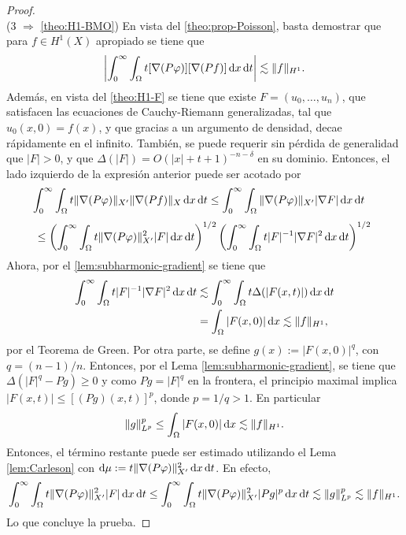 \begin{proof}
\begin{equation*}
	\end{equation*}
	(3 $\Rightarrow$ \cref{theo:H1-BMO}) En vista del \cref{theo:prop-Poisson}, basta demostrar que para $f\in H^1(X)$ apropiado se tiene que
	\begin{equation*}
		\left| \int_0^\infty \int_{\Omega} t[\nabla(P\varphi)][\nabla(Pf)]\mathop{}\!\mathrm{d} x \mathop{}\!\mathrm{d} t
		\right| \lesssim \|f\|_{H^1}.
	\end{equation*}
	Además, en vista del \cref{theo:H1-F} se tiene que existe $F=(u_0,\ldots, u_n)$, que satisfacen las ecuaciones de Cauchy-Riemann generalizadas, tal que $u_0(x, 0)=f(x)$, y que gracias a un argumento de densidad, decae rápidamente en el infinito. También, se puede requerir sin pérdida de generalidad que $|F|>0$, y que $\Delta(|F|) = O(|x|+t+1)^{-n-\delta}$ en su dominio. Entonces, el lado izquierdo de la expresión anterior puede ser acotado por 
	\begin{align*}
		\int_0^\infty \int_{\Omega} t\|\nabla(P\varphi)\|_{X'}\|\nabla(Pf)\|_X\mathop{}\!\mathrm{d} x \mathop{}\!\mathrm{d} t & \leq\int_0^\infty \int_{\Omega}  \|\nabla(P\varphi)\|_{X'}|\nabla F|\mathop{}\!\mathrm{d} x\mathop{}\!\mathrm{d} t
	\end{align*}
	\begin{equation*}
		\leq \left( \int_0^\infty \int_{\Omega} t\|\nabla(P\varphi)\|_{X'}^2|F| \mathop{}\!\mathrm{d} x \mathop{}\!\mathrm{d} t
		\right)^{1/2}\left(\int_0^\infty \int_{\Omega}  t|F|^{-1}|\nabla F|^2 \mathop{}\!\mathrm{d} x \mathop{}\!\mathrm{d} t
		\right)^{1/2}
	\end{equation*}
	Ahora, por el \cref{lem:subharmonic-gradient} se tiene que
	\begin{align*}
		\int_0^\infty\int_{\Omega} t|F|^{-1}|\nabla F|^2 \mathop{}\!\mathrm{d} x \mathop{}\!\mathrm{d} t & \lesssim
		\int_0^\infty\int_{\Omega} t\Delta(|F(x, t)|) \mathop{}\!\mathrm{d} x \mathop{}\!\mathrm{d} t \\
		& = \int_{\Omega} |F(x, 0)| \mathop{}\!\mathrm{d} x \lesssim \|f\|_{H^1},
	\end{align*}
	por el Teorema de Green. Por otra parte, se define $g(x):=|F(x, 0)|^q$, con $q=(n-1)/n$. Entonces, por el Lema \ref{lem:subharmonic-gradient}, se tiene que $\Delta(|F|^q - Pg)\geq 0$ y como $Pg = |F|^q$ en la frontera, el principio maximal implica $|F(x, t)| \leq [(Pg)(x, t)]^p$, donde $p=1/q>1$. En particular
	\begin{equation*}
		\|g\|_{L^p}^p \leq \int_{\Omega}|F(x, 0)|\mathop{}\!\mathrm{d} x \lesssim \|f\|_{H^1}.
	\end{equation*}
	Entonces, el término restante puede ser estimado utilizando el Lema \ref{lem:Carleson} con $\mathop{}\!\mathrm{d}\mu := t\|\nabla(P\varphi)\|_{X'}^2 \mathop{}\!\mathrm{d} x \mathop{}\!\mathrm{d} t$. En efecto,
	\begin{equation*}
		\int_0^\infty \int_{\Omega} t\|\nabla(P\varphi)\|_{X'}^2|F| \mathop{}\!\mathrm{d} x \mathop{}\!\mathrm{d} t \leq \int_0^\infty \int_{\Omega} t\|\nabla(P\varphi)\|_{X'}^2|Pg|^p \mathop{}\!\mathrm{d} x \mathop{}\!\mathrm{d} t \lesssim \|g\|_{L^p}^p \lesssim \|f\|_{H^1}.
	\end{equation*}
	Lo que concluye la prueba.
\end{proof} 
